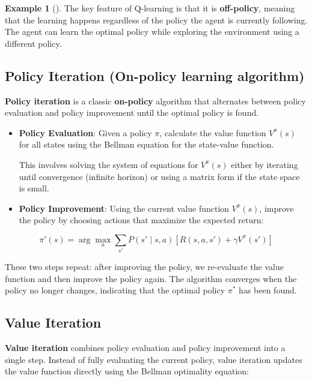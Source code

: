 \documentclass[
  letterpaper,
]{krantz}
\theoremstyle{plain}
\theoremstyle{definition}
\newtheorem{example}{Example}[chapter]
\theoremstyle{definition}
\theoremstyle{remark}
\begin{document}
\begin{example}[]
The key feature of Q-learning is that it is \textbf{off-policy}, meaning
that the learning happens regardless of the policy the agent is
currently following. The agent can learn the optimal policy while
exploring the environment using a different policy.

\subsection{\texorpdfstring{\textbf{Policy Iteration} (On-policy
learning
algorithm)}{Policy Iteration (On-policy learning algorithm)}}\label{policy-iteration-on-policy-learning-algorithm}

\textbf{Policy iteration} is a classic \textbf{on-policy} algorithm that
alternates between policy evaluation and policy improvement until the
optimal policy is found.

\begin{itemize}
\item
  \textbf{Policy Evaluation}: Given a policy \(\pi\), calculate the
  value function \(V^\pi(s)\) for all states using the Bellman equation
  for the state-value function.

  This involves solving the system of equations for \(V^\pi(s)\) either
  by iterating until convergence (infinite horizon) or using a matrix
  form if the state space is small.
\item
  \textbf{Policy Improvement}: Using the current value function
  \(V^\pi(s)\), improve the policy by choosing actions that maximize the
  expected return:
\end{itemize}

\[
\pi'(s) = \arg\max_a \sum_{s'} P(s' \mid s, a) \left[ R(s, a, s') + \gamma V^\pi(s') \right]
\]

These two steps repeat: after improving the policy, we re-evaluate the
value function and then improve the policy again. The algorithm
converges when the policy no longer changes, indicating that the optimal
policy \(\pi^*\) has been found.

\subsection{\texorpdfstring{\textbf{Value
Iteration}}{Value Iteration}}\label{value-iteration}

\textbf{Value iteration} combines policy evaluation and policy
improvement into a single step. Instead of fully evaluating the current
policy, value iteration updates the value function directly using the
Bellman optimality equation:


\end{example}
\end{document}
